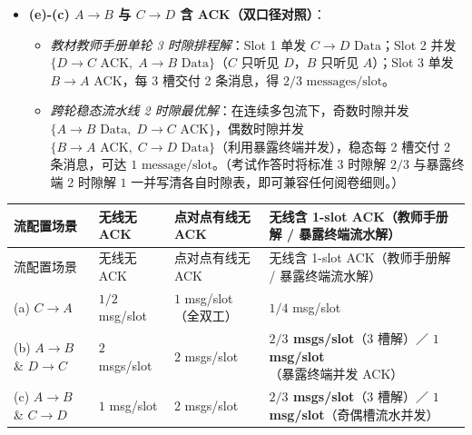 \begin{enumerate}
\begin{itemize}
\begin{itemize}
    \item \emph{教材教师手册保守 3 时隙排程解}（假定相邻节点 $B, C$ 不同时发射）：Slot 1 同时发 $\{A\to B\text{ Data},\; D\to C\text{ Data}\}$；Slot 2 单发 $B\to A\text{ ACK}$；Slot 3 单发 $C\to D\text{ ACK}$，得 \textbf{$2/3\text{ messages/slot}$}。
    \item \emph{严格按题干纯接收碰撞定义的暴露终端 2 时隙最优解}：题干明确规定“只要每个接收端恰好只听到 1 个发送端即接收成功”。在 Slot 2 让 $\{B\to A\text{ ACK},\; C\to D\text{ ACK}\}$ 同时发送——此时接收者是 $A$ 和 $D$，而 $A$ 只听得见 $B$（听不见 $C$）、$D$ 只听得见 $C$（听不见 $B$），两枚 ACK 完全无冲突同时收妥，每 2 个时隙完成 2 条带确认消息，得理论上限 \textbf{$1\text{ message/slot}$}。
    \end{itemize}
  \item \textbf{(e)-(c) $A \to B$ 与 $C \to D$ 含 ACK（双口径对照）}：
    \begin{itemize}
    \item \emph{教材教师手册单轮 3 时隙排程解}：Slot 1 单发 $C\to D\text{ Data}$；Slot 2 并发 $\{D\to C\text{ ACK},\; A\to B\text{ Data}\}$（$C$ 只听见 $D$，$B$ 只听见 $A$）；Slot 3 单发 $B\to A\text{ ACK}$，每 3 槽交付 2 条消息，得 \textbf{$2/3\text{ messages/slot}$}。
    \item \emph{跨轮稳态流水线 2 时隙最优解}：在连续多包流下，奇数时隙并发 $\{A\to B\text{ Data},\; D\to C\text{ ACK}\}$，偶数时隙并发 $\{B\to A\text{ ACK},\; C\to D\text{ Data}\}$（利用暴露终端并发），稳态每 2 槽交付 2 条消息，可达 \textbf{$1\text{ message/slot}$}。（考试作答时将标准 3 时隙解 $2/3$ 与暴露终端 2 时隙解 $1$ 一并写清各自时隙表，即可兼容任何阅卷细则。）
    \end{itemize}
  \end{itemize}
\end{enumerate}

\begingroup\small\setlength{\tabcolsep}{3pt}\renewcommand{\arraystretch}{1.20}
\begin{longtable}{@{}>{\raggedright\arraybackslash}p{}>{\raggedright\arraybackslash}p{}>{\raggedright\arraybackslash}p{}>{\raggedright\arraybackslash}p{}@{}}
\toprule
流配置场景 & 无线无 ACK & 点对点有线无 ACK & 无线含 1-slot ACK（教师手册解 / 暴露终端流水解） \\
\midrule\endfirsthead
流配置场景 & 无线无 ACK & 点对点有线无 ACK & 无线含 1-slot ACK（教师手册解 / 暴露终端流水解） \\
\midrule\endhead
\bottomrule\endfoot
(a) $C \to A$ & $1/2$ msg/slot & $1$ msg/slot（全双工） & $1/4$ msg/slot \\
(b) $A\to B$ \& $D\to C$ & $2$ msgs/slot & $2$ msgs/slot & \textbf{$2/3$ msgs/slot}（3 槽解）／ \textbf{$1$ msg/slot}（暴露终端并发 ACK） \\
(c) $A\to B$ \& $C\to D$ & $1$ msg/slot & $2$ msgs/slot & \textbf{$2/3$ msgs/slot}（3 槽解）／ \textbf{$1$ msg/slot}（奇偶槽流水并发） \\
\end{longtable}\endgroup

